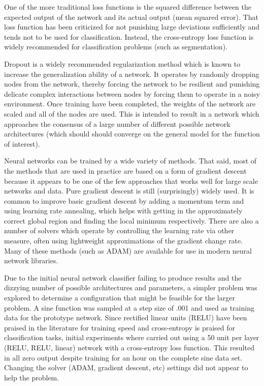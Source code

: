 \documentclass[12pt]{article}
\begin{document}
	One of the more traditional loss functions is the squared difference between the expected output of the network and its actual output (mean squared error).  That loss function has been criticized for not punishing large deviations sufficiently and tends not to be used for classification.  Instead, the cross-entropy loss function is widely recommended for classification problems (such as segmentation).

	Dropout is a widely recommended regularization method which is known to increase the generalization ability of a network.  It operates by randomly dropping nodes from the network, thereby forcing the network to be resilient and punishing delicate complex interactions between nodes by forcing them to operate in a noisy environment.  Once training have been completed, the weights of the network are scaled and all of the nodes are used.  This is intended to result in a network which approaches the consensus of a large number of different possible network architectures (which should should converge on the general model for the function of interest).

	Neural networks can be trained by a wide variety of methods.  That said, most of the methods that are used in practice are based on a form of gradient descent because it appears to be one of the few approaches that works well for large scale networks and data.  Pure gradient descent is still (surprisingly) widely used.  It is common to improve basic gradient descent by adding a momentum term and using learning rate annealing, which helps with getting in the approximately correct global region and finding the local minimum respectively.  There are also a number of solvers which operate by controlling the learning rate via other measure, often using lightweight approximations of the gradient change rate.  Many of these methods (such as ADAM) are available for use in modern neural network libraries.

	Due to the initial neural network classifier failing to produce results and the dizzying number of possible architectures and parameters, a simpler problem was explored to determine a configuration that might be feasible for the larger problem.  A sine function was sampled at a step size of .001 and used as training data for the prototype network.  Since rectified linear units (RELU) have been praised in the literature for training speed and cross-entropy is praised for classification tasks, initial experiments where carried out using a 50 unit per layer (RELU, RELU, linear) network with a cross-entropy loss function.  This resulted in all zero output despite training for an hour on the complete sine data set.  Changing the solver (ADAM, gradient descent, etc) settings did not appear to help the problem.
\end{document}
